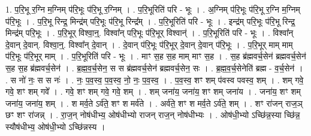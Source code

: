 \documentclass[17pt]{extarticle}
\begin{document}
1. प॒रि॒भू र॒ग्नि म॒ग्निम् प॑रि॒भूः प॑रि॒भू र॒ग्निम् । . प॒रि॒भूरिति॑ परि - भूः । . अ॒ग्निम् प॑रि॒भूः प॑रि॒भू र॒ग्नि म॒ग्निम् प॑रि॒भूः । . प॒रि॒भू रिन्द्र॒ मिन्द्र॑म् परि॒भूः प॑रि॒भू रिन्द्र᳚म् । . प॒रि॒भूरिति॑ परि - भूः । . इन्द्र॑म् परि॒भूः प॑रि॒भू रिन्द्र॒ मिन्द्र॑म् परि॒भूः । . प॒रि॒भूर् विश्वा॒न्॒. विश्वा᳚न् परि॒भूः प॑रि॒भूर् विश्वान्॑ । . प॒रि॒भूरिति॑ परि - भूः । . विश्वा᳚न् दे॒वान् दे॒वान्. विश्वा॒न्॒. विश्वा᳚न् दे॒वान् । . दे॒वान् प॑रि॒भूः प॑रि॒भूर् दे॒वान् दे॒वान् प॑रि॒भूः । . प॒रि॒भूर् माम् माम् प॑रि॒भूः प॑रि॒भूर् माम् । . प॒रि॒भूरिति॑ परि - भूः । . माꣳ स॒ह स॒ह माम् माꣳ स॒ह । . स॒ह ब्र॑ह्मवर्च॒सेन॑ ब्रह्मवर्च॒सेन॑ स॒ह स॒ह ब्र॑ह्मवर्च॒सेन॑ । . ब्र॒ह्म॒व॒र्च॒सेन॒ स स ब्र॑ह्मवर्च॒सेन॑ ब्रह्मवर्च॒सेन॒ सः । . ब्र॒ह्म॒व॒र्च॒सेनेति॑ ब्रह्म - व॒र्च॒सेन॑ । . स नो॑ नः॒ स स नः॑ । . नः॒ प॒व॒स्व॒ प॒व॒स्व॒ नो॒ नः॒ प॒व॒स्व॒ । . प॒व॒स्व॒ शꣳ शम् प॑वस्व पवस्व॒ शम् । . शम् गवे॒ गवे॒ शꣳ शम् गवे᳚ । . गवे॒ शꣳ शम् गवे॒ गवे॒ शम् । . शम् जना॑य॒ जना॑य॒ शꣳ शम् जना॑य । . जना॑य॒ शꣳ शम् जना॑य॒ जना॑य॒ शम् । . श मर्व॒ते ऽर्व॑ते॒ शꣳ श मर्व॑ते । . अर्व॑ते॒ शꣳ श मर्व॒ते ऽर्व॑ते॒ शम् । . शꣳ रा॑जन् राज॒ञ् छꣳ शꣳ रा॑जन्न् । . रा॒ज॒न् नोष॑धीभ्य॒ ओष॑धीभ्यो राजन् राज॒न् नोष॑धीभ्यः । . ओष॑धी॒भ्यो ऽच्छि॑न्न॒स्या च्छि॑न्न॒ स्यौष॑धीभ्य॒ ओष॑धी॒भ्यो ऽच्छि॑न्नस्य । \newline
\end{document}
